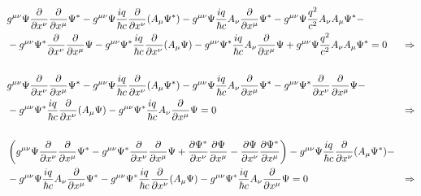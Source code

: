 \begin{align*}
  &g^{\mu\nu} \Psi \frac{\partial }{\partial x^\nu} \frac{\partial }{\partial x^\mu} \Psi^*-   g^{\mu\nu} \Psi \frac{iq}{\hbar c}\frac{\partial }{\partial x^\nu}(A_\mu\Psi^*)-g^{\mu\nu}  \Psi \frac{iq}{\hbar c} A_\nu \frac{\partial }{\partial x^\mu} \Psi^*  -g^{\mu\nu} \Psi \frac{q^2}{c^2}A_\nu A_\mu \Psi^* -
  \\& -g^{\mu\nu} \Psi^* \frac{\partial }{\partial x^\nu} \frac{\partial }{\partial x^\mu} \Psi - g^{\mu\nu} \Psi^* \frac{iq}{\hbar c}\frac{\partial }{\partial x^\nu}(A_\mu \Psi) - g^{\mu\nu}  \Psi^*  \frac{iq}{\hbar c} A_\nu \frac{\partial }{\partial x^\mu} \Psi  +g^{\mu\nu} \Psi \frac{q^2}{c^2}A_\nu A_\mu \Psi^* =0  &\Rightarrow
  \\
  \\ &g^{\mu\nu} \Psi \frac{\partial }{\partial x^\nu} \frac{\partial }{\partial x^\mu} \Psi^*-   g^{\mu\nu} \Psi \frac{iq}{\hbar c}\frac{\partial }{\partial x^\nu}(A_\mu\Psi^*)-g^{\mu\nu}  \Psi \frac{iq}{\hbar c} A_\nu \frac{\partial }{\partial x^\mu} \Psi^*-g^{\mu\nu} \Psi^* \frac{\partial }{\partial x^\nu} \frac{\partial }{\partial x^\mu} \Psi -
  \\&-g^{\mu\nu} \Psi^* \frac{iq}{\hbar c}\frac{\partial }{\partial x^\nu}(A_\mu \Psi) - g^{\mu\nu}  \Psi^*  \frac{iq}{\hbar c} A_\nu \frac{\partial }{\partial x^\mu} \Psi =0  &\Rightarrow 
  \\
  \\ &\left(  g^{\mu\nu} \Psi \frac{\partial }{\partial x^\nu} \frac{\partial }{\partial x^\mu} \Psi^*-g^{\mu\nu} \Psi^* \frac{\partial }{\partial x^\nu} \frac{\partial }{\partial x^\mu} \Psi+ \frac{\partial \Psi^*}{\partial x^\nu} \frac{\partial \Psi}{\partial x^\mu}-\frac{\partial \Psi}{\partial x^\nu} \frac{\partial \Psi^*}{\partial x^\mu} \right)  -   g^{\mu\nu} \Psi \frac{iq}{\hbar c}\frac{\partial }{\partial x^\nu}(A_\mu\Psi^*)-
  \\&-g^{\mu\nu}  \Psi \frac{iq}{\hbar c} A_\nu \frac{\partial }{\partial x^\mu} \Psi^* -g^{\mu\nu} \Psi^* \frac{iq}{\hbar c}\frac{\partial }{\partial x^\nu}(A_\mu \Psi) - g^{\mu\nu}  \Psi^*  \frac{iq}{\hbar c} A_\nu \frac{\partial }{\partial x^\mu} \Psi =0  &\Rightarrow 
\end{align*}
